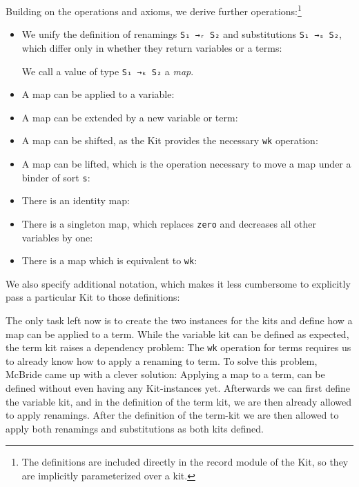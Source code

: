 \documentclass[sigplan,10pt]{acmart}
\newenvironment{LibCode*}{%
  \begin{tcolorbox}[%
    colframe=white,%
    boxrule=0.0pt,%
    top=2.5pt,%
    left=2.5pt,%
    bottom=2.5pt,%
    right=2.5pt,%
    boxsep=0pt%
  ]\vspace{-0.2\baselineskip}%
}{%
  \vspace{-1\baselineskip}%
  \end{tcolorbox}%
}
\newcommand*\LibCode[1]{\begin{LibCode*}{#1}\end{LibCode*}}
\begin{document}
  Building on the operations and axioms, we derive further operations:\footnote{
    The definitions are included directly in the record module of the
    Kit, so they are implicitly parameterized over a kit.
  }
  \begin{itemize}
  \item 
    We unify the definition of renamings \texttt{S₁ →ᵣ S₂} and
    substitutions \texttt{S₁ →ₛ S₂}, which differ only in whether they
    return variables or a terms:
    \LibCode\KMap
    We call a value of type \texttt{S₁ →ₖ S₂} a \emph{map}.
  \item 
    A map can be applied to a variable:
    \LibCode\KAp
  \item 
    A map can be extended by a new variable or term:
    \LibCode\KExt
  \item 
    A map can be shifted, as the Kit provides the necessary \texttt{wk} operation:
    \LibCode\KWkm
  \item 
    A map can be lifted, which is the operation necessary to
    move a map under a binder of sort \texttt{s}:
    \LibCode\KLift
  \item 
    There is an identity map:
    \LibCode\KId
  \item 
    There is a singleton map, which replaces \texttt{zero} and decreases
    all other variables by one:
    \LibCode\KSingle
  \item 
    There is a map which is equivalent to \texttt{wk}:
    \LibCode\KWeaken
  \end{itemize}

  We also specify additional notation, which makes it less cumbersome
  to explicitly pass a particular Kit to those definitions:
  \LibCode\KKitNotation

  The only task left now is to create the two instances for the kits
  and define how a map can be applied to a term.
  While the variable kit can be defined as expected, the term kit
  raises a dependency problem: The \texttt{wk} operation for terms requires us
  to already know how to apply a renaming to term.
  To solve this problem, McBride came up with a clever solution:
  Applying a map to a term, can be defined without even having any Kit-instances yet.
  Afterwards we can first define the variable kit, and in the
  definition of the term kit, we are then already allowed to apply renamings.
  After the definition of the term-kit we are then allowed to apply
  both renamings and substitutions as both kits defined.

  
\end{document}
